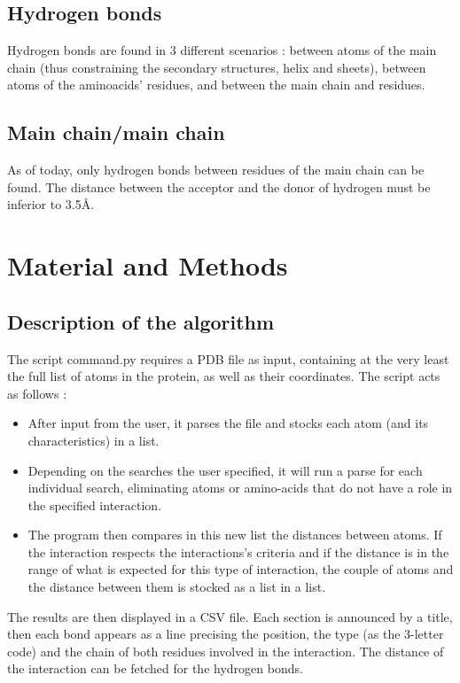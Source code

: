 \documentclass[]{article}
\begin{document}
\subsection{Hydrogen bonds}
Hydrogen bonds are found in 3 different scenarios : between atoms of the main chain (thus constraining the secondary structures, helix and sheets), between atoms of the aminoacids' residues, and between the main chain and residues.
\subsection{Main chain/main chain}
As of today, only hydrogen bonds between residues of the main chain can be found.
The distance between the acceptor and the donor of hydrogen must be inferior to 3.5\si{\angstrom}.

\section{Material and Methods}
\subsection{Description of the algorithm}
The script command.py requires a PDB file as input, containing at the very least the full list of atoms in the protein, as well as their coordinates.
The script acts as follows :
\begin{itemize}
	\item After input from the user, it parses the file and stocks each atom (and its characteristics) in a list.
	\item Depending on the searches the user specified, it will run a parse for each individual search, eliminating atoms or amino-acids that do not have a role in the specified interaction.
	\item The program then compares in this new list the distances between atoms. If the interaction respects the interactions's criteria and if the distance is in the range of what is expected for this type of interaction, the couple of atoms and the distance between them is stocked as a list in a list.
\end{itemize}

The results are then displayed in a CSV file.
Each section is announced by a title, then each bond appears as a line precising the position, the type (as the 3-letter code) and the chain of both residues involved in the interaction.
The distance of the interaction can be fetched for the hydrogen bonds.
\end{document}

